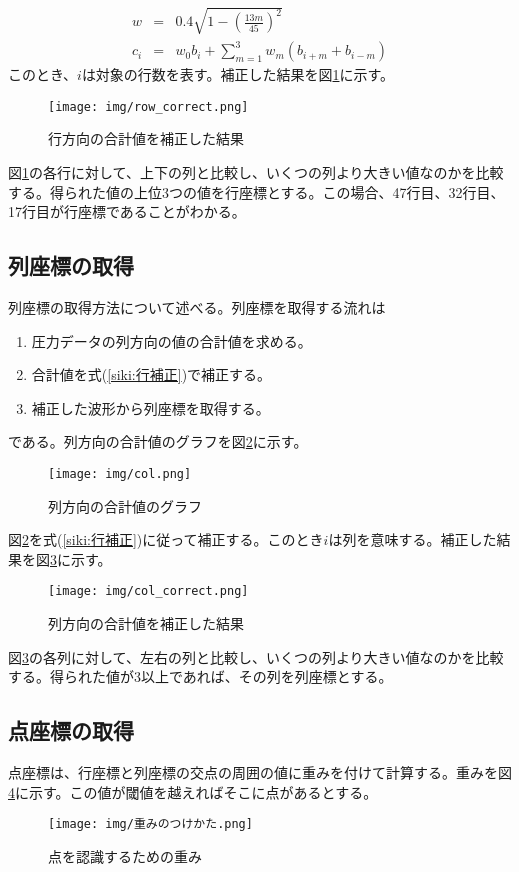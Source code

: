 \begin{eqnarray}
	w &=& 0.4\sqrt{1-\left(\frac{13m}{45}\right)^2}\nonumber\\
	c_i &=& w_0b_i + \sum^3_{m=1}w_m(b_{i+m}+b_{i-m})\label{siki:行補正}
\end{eqnarray}
このとき、$i$は対象の行数を表す。補正した結果を図\ref{f:行方向の合計_補正}に示す。
\begin{figure}[H]
	\centering
	\texttt{[image: img/row\_correct.png]}
	\caption{行方向の合計値を補正した結果}
	\label{f:行方向の合計_補正}
\end{figure}
図\ref{f:行方向の合計_補正}の各行に対して、上下の列と比較し、いくつの列より大きい値なのかを比較する。得られた値の上位3つの値を行座標とする。この場合、47行目、32行目、17行目が行座標であることがわかる。

\subsection{列座標の取得}
列座標の取得方法について述べる。列座標を取得する流れは
\begin{enumerate}
	\item 圧力データの列方向の値の合計値を求める。
	\item 合計値を式(\ref{siki:行補正})で補正する。
	\item 補正した波形から列座標を取得する。
\end{enumerate}
である。列方向の合計値のグラフを図\ref{f:列方向の合計}に示す。
\begin{figure}[H]
	\centering
	\texttt{[image: img/col.png]}
	\caption{列方向の合計値のグラフ}
	\label{f:列方向の合計}
\end{figure}
図\ref{f:列方向の合計}を式(\ref{siki:行補正})に従って補正する。このとき$i$は列を意味する。補正した結果を図\ref{f:列方向の合計_補正}に示す。
\begin{figure}[H]
	\centering
	\texttt{[image: img/col\_correct.png]}
	\caption{列方向の合計値を補正した結果}
	\label{f:列方向の合計_補正}
\end{figure}
図\ref{f:列方向の合計_補正}の各列に対して、左右の列と比較し、いくつの列より大きい値なのかを比較する。得られた値が3以上であれば、その列を列座標とする。

\subsection{点座標の取得}
点座標は、行座標と列座標の交点の周囲の値に重みを付けて計算する。重みを図\ref{f:重み}に示す。この値が閾値を越えればそこに点があるとする。
\begin{figure}[H]
	\centering
	\texttt{[image: img/重みのつけかた.png]}
	\caption{点を認識するための重み}
	\label{f:重み}
\end{figure}

